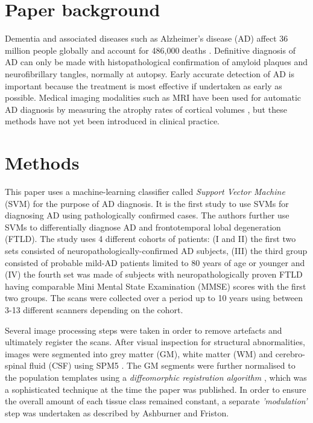 \documentclass[11pt,a4paper,oneside]{report}
\begin{document}
\section*{Paper background}

Dementia and associated diseases such as Alzheimer's disease (AD) affect 36 million people globally \cite{world2012dementia} and account for 486,000 deaths \cite{lozano2013global}. Definitive diagnosis of AD can only be made with histopathological confirmation of amyloid plaques and neurofibrillary tangles, normally at autopsy. Early accurate detection of AD is important because the treatment is most effective if undertaken as early as possible. Medical imaging modalities such as MRI have been used for automatic AD diagnosis by measuring the atrophy rates of cortical volumes \cite{fox2004imaging,barnes2004differentiating,wahlund2005evidence}, but these methods have not yet been introduced in clinical practice.

\section*{Methods}

This paper uses a machine-learning classifier called \emph{Support Vector Machine} (SVM) for the purpose of AD diagnosis. It is the first study to use SVMs for diagnosing AD using pathologically confirmed cases. The authors further use SVMs to differentially diagnose AD and frontotemporal lobal degeneration (FTLD). The study uses 4 different cohorts of patients: (I and II) the first two sets consisted of neuropathologically-confirmed AD subjects, (III) the third group consisted of probable mild-AD patients limited to 80 years of age or younger and (IV) the fourth set was made of subjects with neuropathologically proven FTLD having comparable Mini Mental State Examination (MMSE) scores with the first two groups. The scans were collected over a period up to 10 years using between 3-13 different scanners depending on the cohort.

Several image processing steps were taken in order to remove artefacts and ultimately register the scans. After visual inspection for structural abnormalities, images were segmented into grey matter (GM), white matter (WM) and cerebro-spinal fluid (CSF) using SPM5 \cite{SPM5}. The GM segments were further normalised to the population templates using a \emph{diffeomorphic registration algorithm} \cite{ashburner2007fast}, which was a sophisticated technique at the time the paper was published. In order to ensure the overall amount of each tissue class remained constant, a separate \emph{'modulation'} step was undertaken as described by Ashburner and Friston. \cite{ashburner2000voxel}
\end{document}

